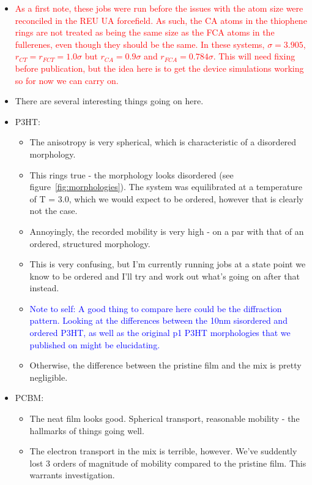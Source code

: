 \documentclass[12pt]{article}
\begin{document}
\begin{itemize}
    \item{\textcolor{red}{As a first note, these jobs were run before the issues with the atom size were reconciled in the REU UA forcefield.
                As such, the CA atoms in the thiophene rings are not treated as being the same size as the FCA atoms in the fullerenes, even though they should be the same.
                In these systems, $\sigma = 3.905$, $r_{CT} = r_{FCT} = 1.0 \sigma$ but $r_{CA} = 0.9 \sigma$ and $r_{FCA} = 0.784 \sigma$.
        This will need fixing before publication, but the idea here is to get the device simulations working so for now we can carry on.}}
    \item{There are several interesting things going on here.}
    \item{P3HT:
            \begin{itemize}
                \item{The anisotropy is very spherical, which is characteristic of a disordered morphology.}
                \item{This rings true - the morphology looks disordered (see figure~\ref{fig:morphologies}).
                    The system was equilibrated at a temperature of T = 3.0, which we would expect to be ordered, however that is clearly not the case.}
                \item{Annoyingly, the recorded mobility is very high - on a par with that of an ordered, structured morphology.}
                \item{This is very confusing, but I'm currently running jobs at a state point we know to be ordered and I'll try and work out what's going on after that instead.}
                \item{\textcolor{blue}{Note to self: A good thing to compare here could be the diffraction pattern.
                    Looking at the differences between the 10nm sisordered and ordered P3HT, as well as the original p1 P3HT morphologies that we published on might be elucidating.}}
                \item{Otherwise, the difference between the pristine film and the mix is pretty negligible.}
            \end{itemize}
    }
    \item{PCBM:
            \begin{itemize}
                \item{The neat film looks good. Spherical transport, reasonable mobility - the hallmarks of things going well.}
                \item{The electron transport in the mix is terrible, however. 
                        We've suddently lost 3 orders of magnitude of mobility compared to the pristine film.
                    This warrants investigation.}
            \end{itemize}
        }
\end{itemize}
\end{document}
